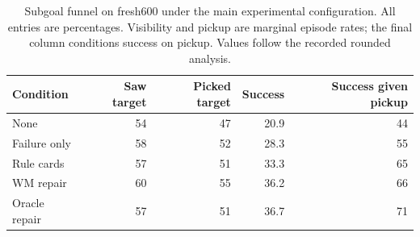 \begin{table}[tbp]
\caption{Subgoal funnel on fresh600 under the main experimental configuration. All entries are percentages. Visibility and pickup are marginal episode rates; the final column conditions success on pickup. Values follow the recorded rounded analysis.}
\label{tab:funnel}\centering
\begin{tabular}{lrrrr}\toprule
Condition & Saw target & Picked target & Success & Success given pickup\\\midrule
None & 54 & 47 & 20.9 & 44\\
Failure only & 58 & 52 & 28.3 & 55\\
Rule cards & 57 & 51 & 33.3 & 65\\
WM repair & 60 & 55 & 36.2 & 66\\
Oracle repair & 57 & 51 & 36.7 & 71\\\bottomrule
\end{tabular}
\end{table}
